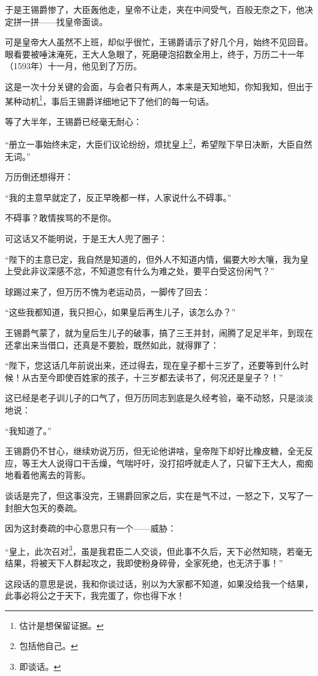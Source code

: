 \begin{multicols}{\theparacolNo}
于是王锡爵惨了，大臣轰他走，皇帝不让走，夹在中间受气，百般无奈之下，他决定拼一拼——找皇帝面谈。

可是皇帝大人虽然不上班，却似乎很忙，王锡爵请示了好几个月，始终不见回音。眼看要被唾沫淹死，王大人急眼了，死磨硬泡招数全用上，终于，万历二十一年（1593年）十一月，他见到了万历。

这是一次十分关键的会面，与会者只有两人，本来是天知地知，你知我知，但出于某种动机\footnote{估计是想保留证据。}，事后王锡爵详细地记下了他们的每一句话。

等了大半年，王锡爵已经毫无耐心：

“册立一事始终未定，大臣们议论纷纷，烦扰皇上\footnote{包括他自己。}，希望陛下早日决断，大臣自然无词。”

万历倒还想得开：

“我的主意早就定了，反正早晚都一样，人家说什么不碍事。”

不碍事？敢情挨骂的不是你。

可这话又不能明说，于是王大人兜了圈子：

“陛下的主意已定，我自然是知道的，但外人不知道内情，偏要大吵大嚷，我为皇上受此非议深感不忿，不知道您有什么为难之处，要平白受这份闲气？”

球踢过来了，但万历不愧为老运动员，一脚传了回去：

“这些我都知道，我只担心，如果皇后再生儿子，该怎么办？”

王锡爵气蒙了，就为皇后生儿子的破事，搞了三王并封，闹腾了足足半年，到现在还拿出来当借口，还真是不要脸，既然如此，就得罪了：

“陛下，您这话几年前说出来，还过得去，现在皇子都十三岁了，还要等到什么时候！从古至今即使百姓家的孩子，十三岁都去读书了，何况还是皇子？！”

这已经是老子训儿子的口气了，但万历同志到底是久经考验，毫不动怒，只是淡淡地说：

“我知道了。”

王锡爵仍不甘心，继续劝说万历，但无论他讲啥，皇帝陛下却好比橡皮糖，全无反应，等王大人说得口干舌燥，气喘吁吁，没打招呼就走人了，只留下王大人，痴痴地看着他离去的背影。

谈话是完了，但这事没完，王锡爵回家之后，实在是气不过，一怒之下，又写了一封胆大包天的奏疏。

因为这封奏疏的中心意思只有一个——威胁：

“皇上，此次召对\footnote{即谈话。}，虽是我君臣二人交谈，但此事不久后，天下必然知晓，若毫无结果，将被天下人群起攻之，我即使粉身碎骨，全家死绝，也无济于事！”

这段话的意思是说，我和你谈过话，别以为大家都不知道，如果没给我一个结果，此事必将公之于天下，我完蛋了，你也得下水！


\end{multicols}
